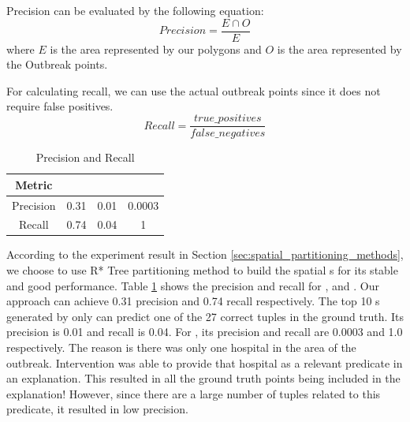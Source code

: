 Precision can be evaluated by the following equation:
$$Precision = \frac{E \cap O}{E}$$
where $E$ is the area represented by our polygons and $O$ is the area represented by the Outbreak points.

For calculating recall, we can use the actual outbreak points since it does not require false positives.
$$Recall = \frac{true\_positives}{false\_negatives}$$

\begin{table}[]
	\centering
	\caption{Precision and Recall}
	\begin{tabular}{|c|c|c|c|}
		\hline
		Metric & {\solution} & {\aggravation} & {\intervention} \\ \hline
		Precision & 0.31 & 0.01 & 0.0003\\ \hline
		Recall &  0.74 & 0.04 & 1\\ \hline
	\end{tabular}
	\label{tab:precision_and_recall}
\end{table}


According to the experiment result in Section \ref{sec:spatial_partitioning_methods}, we choose to use R* Tree partitioning method to build the spatial {\explanation}s for its stable and good performance.
Table \ref{tab:precision_and_recall} shows the precision and recall for {\solution}, {\aggravation} and {\intervention}. 
Our approach {\solution} can achieve 0.31 precision and 0.74 recall respectively. 
The top 10 {\explanation}s generated by {\aggravation} only can predict one of the 27 correct tuples in the ground truth. Its precision is 0.01 and recall is 0.04.
For {\intervention}, its precision and recall are 0.0003 and 1.0 respectively. 
The reason is there was only one hospital in the area of the outbreak. 
Intervention was able to provide that hospital as a relevant predicate in an explanation. 
This resulted in all the ground truth points being included in the explanation! 
However, since there are a large number of tuples related to this predicate, it resulted in low precision.


